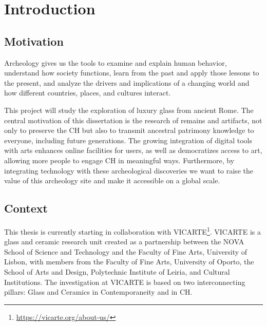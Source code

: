 
%

\chapter{Introduction}
\label{cha:introduction}

\section{Motivation}
\label{sec:motivation}
Archeology gives us the tools to examine and explain human behavior, understand how 
society functions, learn from the past and apply those lessons to the present, and analyze
 the drivers and implications of a changing world and how different countries, places, and cultures interact.~\cite{oxfordarchaeology2025}

 This project will study the exploration of luxury glass from ancient Rome.
The central motivation of this dissertation is the research of remains and artifacts, not
 only to preserve the \gls{CH} but also to transmit ancestral patrimony knowledge to everyone, including future generations. 
 The growing integration of digital tools with arts enhances online 
facilities for users, as well as democratizes access to art, allowing more people to engage 
\gls{CH} in meaningful ways. Furthermore, by integrating technology with these archeological 
discoveries we want to raise the value of this archeology site and make it accessible on a global scale.



\section{Context}
\label{sec:context}
This thesis is currently starting in collaboration with \gls{VICARTE}\footnote{\url{https://vicarte.org/about-us/}}. \gls{VICARTE} is a glass and 
ceramic research unit created as a partnership between the NOVA School of Science and Technology and the Faculty of Fine Arts, University of Lisbon, with members from the Faculty of Fine Arts, University of Oporto, the School of Arts and Design, Polytechnic Institute of Leiria, and Cultural Institutions.
The investigation at \gls{VICARTE} is based on two interconnecting pillars: Glass and Ceramics in Contemporaneity and in \gls{CH}. 

